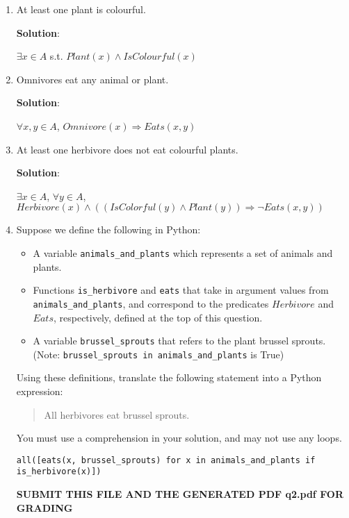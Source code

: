 \documentclass{article}
\begin{document}
\begin{enumerate}
\item
At least one plant is colourful.

\textbf{Solution}:

$\exists x \in A$ s.t. $Plant(x) \land IsColourful(x)$

\item
Omnivores eat any animal or plant.

\textbf{Solution}:

$\forall x, y \in A$, $Omnivore(x) \Rightarrow Eats(x, y)$

\item
At least one herbivore does not eat colourful plants.

\textbf{Solution}:

$\exists x \in A$, $\forall y \in A$, $Herbivore(x) \land ((IsColorful(y) \land Plant(y)) \Rightarrow \neg Eats(x, y))$

\item
Suppose we define the following in Python:
\begin{itemize}
    \item A variable \texttt{animals\_and\_plants} which represents a set of animals and plants.
    \item Functions \texttt{is\_herbivore} and \texttt{eats} that take in argument values from \texttt{animals\_and\_plants}, and correspond to the predicates $Herbivore$ and $Eats$, respectively, defined at the top of this question.
    \item A variable \texttt{brussel\_sprouts} that refers to the plant brussel sprouts. (Note: \texttt{brussel\_sprouts in animals\_and\_plants}  is True)
\end{itemize}

Using these definitions, translate the following statement into a Python expression:
\begin{quote}
All herbivores eat brussel sprouts.
\end{quote}

You must use a comprehension in your solution, and may not use any loops.

\begin{verbatim}
all([eats(x, brussel_sprouts) for x in animals_and_plants if is_herbivore(x)])

\end{verbatim}

\begin{center}
    \textbf{SUBMIT THIS FILE AND THE GENERATED PDF q2.pdf FOR GRADING}
\end{center}
\end{enumerate}
\end{document}

